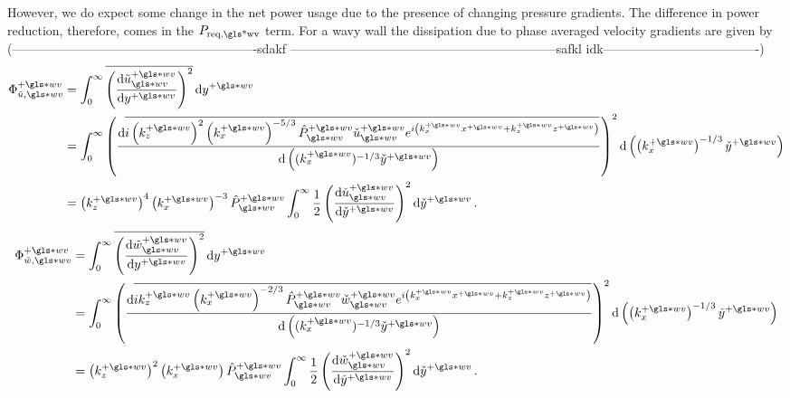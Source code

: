 However, we do expect some change in the net power usage due to the presence of changing pressure gradients. The difference in power reduction, therefore, comes in the $P_\text{req,\gls*{wv}} $ term. For a wavy wall the dissipation due to phase averaged velocity gradients are given by (----------------------------------------------------------sdakf ---------------------------------------------------------------safkl idk-------------------------------------)
\begin{align}
	\Phi _{\tilde{u},\gls*{wv}}\pw &= \int_{0}^{\infty} \overline{\left( \dv{\tilde{u}\ww\pw}{y\pw}  \right) ^2} \dd{y\pw}   \\
				       &= \int_{0}^{\infty} \left( \dv{\overline{i\left( k_z\pw \right) ^2 \left( k_x\pw \right) ^{-5 /3}  \hat{P}\pw\ww \check{u}\pw\ww e^{i\left( k_x\pw x\pw +k_z \pw z\pw \right)}}}{\left((k_x\pw)^{-1 /3}\check{y}\pw\right)}  \right) ^2 \dd{\left(\left(k_x\pw\right)^{-1 /3}\check{y}\pw\right)}   \\
				       &= \left(k_z\pw\right)^4\left(k_x\pw\right)^{-3}\hat{P}\ww\pw\int_{0}^{\infty}\frac{1}{2} \left( \dv{\check{u}\ww\pw}{\check{y}\pw}  \right) ^2 \dd{\check{y}\pw} \label{eq:fiwwpwu}
.\end{align}
\begin{align}
	\Phi _{\tilde{w},\gls*{wv}}\pw &= \int_{0}^{\infty} \overline{\left( \dv{\tilde{w}\ww\pw}{y\pw}  \right) ^2} \dd{y\pw}   \\
				       &= \int_{0}^{\infty} \left( \dv{\overline{ik_z\pw \left( k_x\pw \right) ^{-2 /3}\hat{P}\pw\ww \check{w}\pw\ww e^{i\left( k_x\pw x\pw +k_z \pw z\pw \right)}}}{\left((k_x\pw)^{-1 /3}\check{y}\pw\right)}  \right) ^2 \dd{\left(\left(k_x\pw\right)^{-1 /3}\check{y}\pw\right)}   \\
				       &= \left(k_z\pw\right)^{2}\left(k_x\pw\right)\hat{P}\ww\pw\int_{0}^{\infty}\frac{1}{2} \left( \dv{\check{w}\ww\pw}{\check{y}\pw}  \right) ^2 \dd{\check{y}\pw} \label{eq:fiwwpww}
.\end{align}

